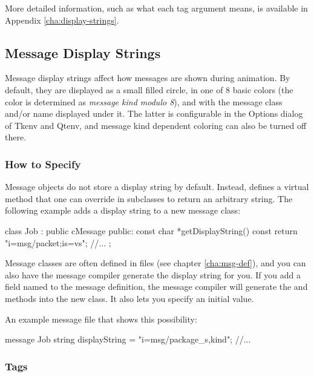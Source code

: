 More detailed information, such as what each tag argument means, is
available in Appendix \ref{cha:display-strings}.


\subsection{Message Display Strings}
\label{sec:graphics:message-displaystrings}

Message display strings affect how messages are shown during animation.
By default, they are displayed as a small filled circle, in one of
8 basic colors (the color is determined as \textit{message kind modulo 8}),
and with the message class and/or name displayed under it.
The latter is configurable in the Options dialog of Tkenv and Qtenv,
and message kind dependent coloring can also be turned off there.

\subsubsection{How to Specify}
\label{sec:graphics:specifying-message-displaystrings}

Message objects do not store a display string by default. Instead,
 defines a virtual  method
that one can override in subclasses to return an arbitrary string.
The following example adds a display string to a new message class:

\begin{cpp}
class Job : public cMessage
{
  public:
    const char *getDisplayString() const {return "i=msg/packet;is=vs";}
    //...
};
\end{cpp}

Message classes are often defined in  files (see chapter
\ref{cha:msg-def}), and you can also have the message compiler
generate the display string for you. If you add a field named
 to the message definition, the message compiler will
generate the  and 
methods into the new class. It also lets you specify an initial value.

An example message file that shows this possibility:

\begin{msg}
message Job
{
    string displayString = "i=msg/package_s,kind";
    //...
}
\end{msg}

\subsubsection{Tags}
\label{sec:graphics:message-displaystring-tags}

